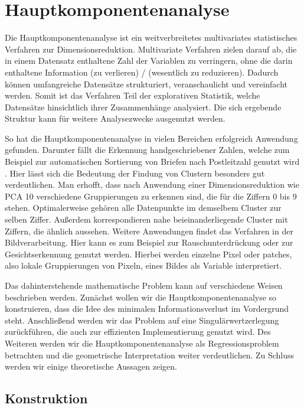 \chapter{Hauptkomponentenanalyse}

\label{pca}

Die Hauptkomponentenanalyse ist ein weitverbreitetes multivariates statistisches Verfahren zur Dimensionsreduktion. Multivariate Verfahren zielen darauf ab, die in einem Datensatz enthaltene Zahl der Variablen zu verringern, ohne die darin enthaltene Information (zu verlieren) / (wesentlich zu reduzieren). Dadurch können umfangreiche Datensätze strukturiert, veranschaulicht und vereinfacht werden. Somit ist das Verfahren Teil der explorativen Statistik, welche Datensätze hinsichtlich ihrer Zusammenhänge analysiert. Die sich ergebende Struktur kann für weitere Analysezwecke ausgenutzt werden.

So hat die Hauptkomponentenanalyse in vielen Bereichen erfolgreich Anwendung gefunden. Darunter fällt die Erkennung handgeschriebener Zahlen, welche zum Beispiel zur automatischen Sortierung von Briefen nach Postleitzahl genutzt wird \cite{hastie_elements}. Hier lässt sich die Bedeutung der Findung von Clustern besonders gut verdeutlichen. Man erhofft, dass nach Anwendung einer Dimensionsreduktion wie PCA 10 verschiedene Gruppierungen zu erkennen sind, die für die Ziffern 0 bis 9 stehen. Optimalerweise gehören alle Datenpunkte im demselbem Cluster zur selben Ziffer. Außerdem korrespondieren nahe beieinanderliegende Cluster mit Ziffern, die ähnlich aussehen. Weitere Anwendungen findet das Verfahren in der Bildverarbeitung. Hier kann es zum Beispiel zur Rauschunterdrückung \cite{babu} oder zur Gesichtserkennung \cite{jiang} genutzt werden. Hierbei werden einzelne Pixel oder patches, also lokale Gruppierungen von Pixeln, eines Bildes als Variable interpretiert.

Das dahinterstehende mathematische Problem kann auf verschiedene Weisen beschrieben werden. Zunächst wollen wir die Hauptkomponentenanalyse so konstruieren, dass die Idee des minimalen Informationsverlust im Vordergrund steht. Anschließend werden wir das Problem auf eine Singulärwertzerlegung zurückführen, die auch zur effizienten Implementierung genutzt wird. Des Weiteren werden wir die Hauptkomponentenanalyse als Regressionsproblem betrachten und die geometrische Interpretation weiter verdeutlichen. Zu Schluss werden wir einige theoretische Aussagen zeigen.

\section{Konstruktion}

